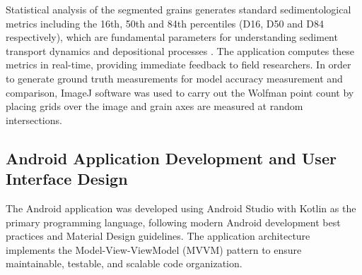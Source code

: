 \documentclass[final-report]{report-template}
\begin{document}
Statistical analysis of the segmented grains generates standard sedimentological metrics including the 16th, 50th and 84th percentiles (D16, D50 and D84 respectively), which are fundamental parameters for understanding sediment transport dynamics and depositional processes \citep{Purinton2019}. The application computes these metrics in real-time, providing immediate feedback to field researchers. In order to generate ground truth measurements for model accuracy measurement and comparison, ImageJ software was used to carry out the Wolfman point count by placing grids over the image and grain axes are measured at random intersections.

\subsection{Android Application Development and User Interface Design}
The Android application was developed using Android Studio with Kotlin as the primary programming language, following modern Android development best practices and Material Design guidelines. The application architecture implements the Model-View-ViewModel (MVVM) pattern to ensure maintainable, testable, and scalable code organization.
\end{document}

